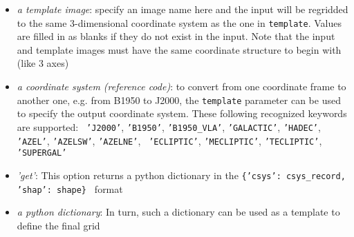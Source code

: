 \begin{itemize}
  \item {\it a template image}: specify an image name here and the
    input will be regridded to the same 3-dimensional coordinate
    system as the one in {\tt template}. Values are filled in as
    blanks if they do not exist in the input. Note that the input and
    template images must have the same coordinate structure to begin
    with (like 3 axes)
  \item {\it a coordinate system (reference code)}: to convert from one coordinate
    frame to another one, e.g. from B1950 to J2000, the {\tt template}
    parameter can be used to specify the output coordinate
    system. These following recognized keywords are supported: {\tt
      'J2000'}, {\tt 'B1950'}, {\tt 'B1950\_VLA'}, {\tt 'GALACTIC'},
    {\tt 'HADEC'}, {\tt 'AZEL'}, {\tt 'AZELSW'}, {\tt 'AZELNE'}, {\tt
      'ECLIPTIC'}, {\tt 'MECLIPTIC'}, {\tt 'TECLIPTIC'}, {\tt 'SUPERGAL'}

   \item {\it 'get'}: This option returns a python dictionary in the
     {\tt \{'csys': csys\_record, 'shap': shape\}  } format

   \item {\it a python dictionary}: In turn, such a dictionary can be
     used as a template to define the final grid
\end{itemize}

  

%
%
%
%
%




